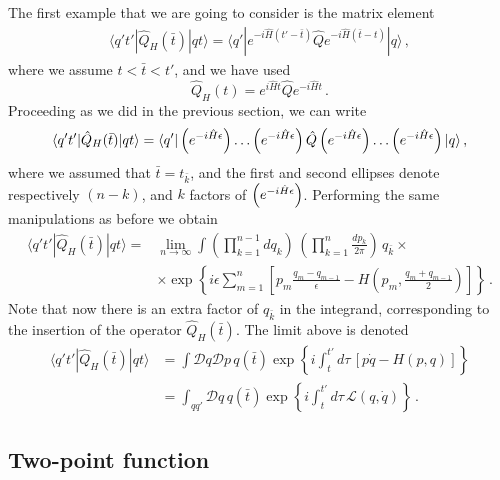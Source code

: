 The first example that we are going to consider is the matrix element
\begin{align}
  \label{eq:OnePtDef}
  \langle q't' | \hat{Q}_H(\bar{t}) | q t\rangle = 
  \langle q' | e^{-i \hat{H}(t'-\bar{t})} \hat{Q} e^{-i \hat{H}(\bar{t}-t)}
  | q\rangle\, ,
\end{align}
where we assume $t<\bar{t}<t'$, and we have used
\begin{equation}
  \label{eq:HeisenOpEvol}
  \hat{Q}_H(t) = e^{i\hat{H} t} \hat{Q} e^{-i\hat{H} t}\, .
\end{equation}
Proceeding as we did in the previous section, we can write
\begin{align}
  \label{eq:CorrOne}
  \langle q't' | \hat{Q}_H(\bar{t}) | q t\rangle = 
  \langle q' | \left(e^{-i \hat{H} \epsilon}\right) \ldots \left(e^{-i \hat{H} \epsilon}\right) \hat{Q} \left(e^{-i \hat{H} \epsilon}\right) \ldots
  \left(e^{-i \hat{H} \epsilon}\right) | q \rangle\, ,
\end{align}
where we assumed that $\bar{t}=t_{\bar k}$, and the first and second ellipses
denote respectively $(n-k)$, and $k$ factors of $\left(e^{-i \hat{H} \epsilon}\right)$. Performing
the same manipulations as before we obtain
\begin{align}
  \langle q't' | \hat{Q}_H(\bar{t}) | q t\rangle =& 
  \lim_{n\to\infty} \int 
  \left(\prod_{k=1}^{n-1}dq_k\right) \, 
  \left(\prod_{k=1}^{n} \frac{dp_k}{2\pi}\right)\, q_{\bar k} \times \\
  &\times \exp \left\{
    i\epsilon \sum_{m=1}^{n} \left[
    p_m \frac{q_m-q_{m-1}}{\epsilon} - H\left(p_m, 
    \frac{q_m+q_{m-1}}{2}\right)
    \right]
    \right\}\, .
\end{align}
Note that now there is an extra factor of $q_{\bar k}$ in the integrand,
corresponding to the insertion of the operator $\hat{Q}_H(\bar{t})$. The
limit above  is denoted
\begin{align}
  \langle q't' | \hat{Q}_H(\bar{t}) | q t\rangle &= 
  \int \mathcal{D}q \mathcal{D}p \, q(\bar{t}) 
  \exp \left\{
  i \int_t^{t'} d\tau\, \left[
  p \dot{q} - H(p,q)
  \right]
  \right\}\\
&= \int_{qq'} \mathcal{D}q \, q(\bar{t}) 
  \exp \left\{
  i \int_t^{t'} d\tau\, \mathcal{L}(q,\dot{q})
  \right\}\, .
\end{align}

\subsection{Two-point function}
\label{sec:two-point-function}

